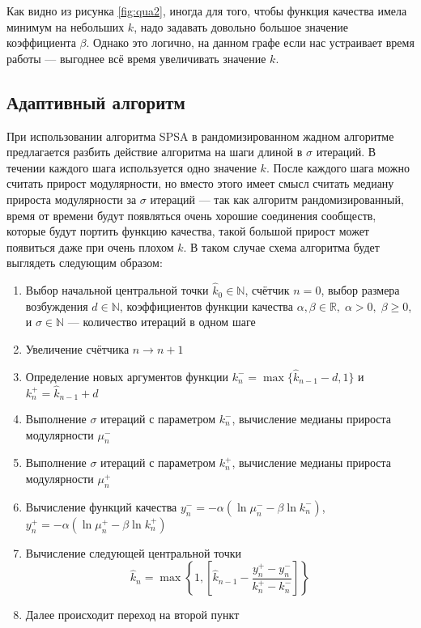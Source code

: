 Как видно из рисунка \ref{fig:qua2}, иногда для того, чтобы функция качества имела минимум на небольших $k$, надо задавать довольно большое значение коэффициента $\beta$. Однако это логично, на данном графе если нас устраивает время работы --- выгоднее всё время увеличивать значение $k$.



\subsection{Адаптивный алгоритм}

При использовании алгоритма SPSA в рандомизированном жадном алгоритме предлагается разбить действие алгоритма на шаги длиной в $\sigma$ итераций. В течении каждого шага используется одно значение $k$. После каждого шага можно считать прирост модулярности, но вместо этого имеет смысл считать медиану прироста модулярности за $\sigma$ итераций --- так как алгоритм рандомизированный, время от времени будут появляться очень хорошие соединения сообществ, которые будут портить функцию качества, такой большой прирост может появиться даже при очень плохом $k$. В таком случае схема алгоритма будет выглядеть следующим образом:

\begin{enumerate}
	\item Выбор начальной центральной точки $\hat{k}_0 \in \mathbb{N}$, счётчик $n = 0$, выбор размера возбуждения $d \in \mathbb{N}$, коэффициентов функции качества $\alpha, \beta \in \mathbb{R},\; \alpha > 0,\;\beta \ge 0$, и $\sigma \in \mathbb{N}$ --- количество итераций в одном шаге
	\item Увеличение счётчика $n \rightarrow n + 1$
	\item Определение новых аргументов функции $k_{n}^{-} = \max\{\hat{k}_{n - 1} - d, 1\}$ и $k_{n}^{+}=\hat{k}_{n - 1} + d$
	\item Выполнение $\sigma$ итераций с параметром $k_{n}^{-}$, вычисление медианы прироста модулярности $\mu_n^{-}$
	\item Выполнение $\sigma$ итераций с параметром $k_{n}^{+}$, вычисление медианы прироста модулярности $\mu_n^{+}$
	\item Вычисление функций качества $y_n^{-} = -\alpha (\ln \mu_n^{-} - \beta \ln k_n^{-})$, $y_n^{+} = -\alpha (\ln \mu_n^{+} - \beta \ln k_n^{+})$
	\item Вычисление следующей центральной точки
	\begin{equation} \label{eq:arg-centre}
		\hat{k}_n = \max\left\{1, \left[\hat{k}_{n - 1} - \frac{y_n^{+} - y_n^{-}}{k_n^{+} - k_n^{-}}\right]\right\}
	\end{equation}
	\item Далее происходит переход на второй пункт
\end{enumerate}

